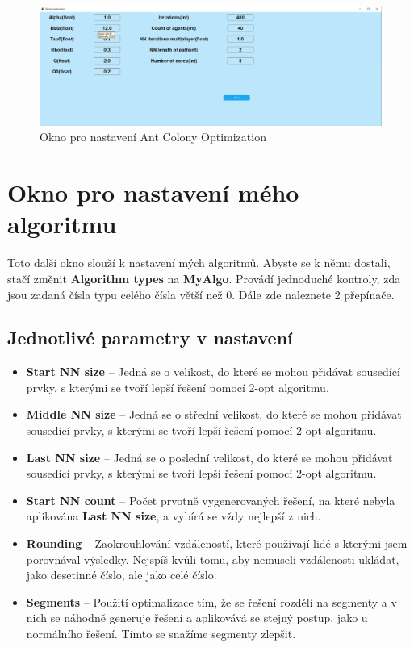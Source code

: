\begin{figure}
    \centering
    \includegraphics[width=15cm]{obrazky-figures/ACO_settings.png}
    \caption{Okno pro nastavení Ant Colony Optimization}
    \label{fig:settings_ACO}
\end{figure}


\section{Okno pro nastavení mého algoritmu}
Toto další okno slouží k nastavení mých algoritmů. Abyste se k němu dostali, stačí změnit \textbf{Algorithm types} na \textbf{MyAlgo}. Provádí jednoduché kontroly, zda jsou zadaná čísla typu celého čísla větší než 0. Dále zde naleznete 2 přepínače.

\subsection{Jednotlivé parametry v nastavení}
\begin{itemize}
    \item \textbf{Start NN size} -- Jedná se o velikost, do které se mohou přidávat sousedící prvky, s kterými se tvoří lepší řešení pomocí 2-opt algoritmu.
    \item \textbf{Middle NN size} -- Jedná se o střední velikost, do které se mohou přidávat sousedící prvky, s kterými se tvoří lepší řešení pomocí 2-opt algoritmu.
    \item \textbf{Last NN size} -- Jedná se o poslední velikost, do které se mohou přidávat sousedící prvky, s kterými se tvoří lepší řešení pomocí 2-opt algoritmu.
    \item \textbf{Start NN count} -- Počet prvotně vygenerovaných řešení, na které nebyla aplikována \textbf{Last NN size}, a vybírá se vždy nejlepší z nich.
    \item \textbf{Rounding} -- Zaokrouhlování vzdáleností, které používají lidé s kterými jsem porovnával výsledky. Nejspíš kvůli tomu, aby nemuseli vzdálenosti ukládat, jako desetinné číslo, ale jako celé číslo. 
    \item \textbf{Segments} -- Použití optimalizace tím, že se řešení rozdělí na segmenty a v nich se náhodně generuje řešení a aplikovává se stejný postup, jako u normálního řešení. Tímto se snažíme segmenty zlepšit. 
\end{itemize}





